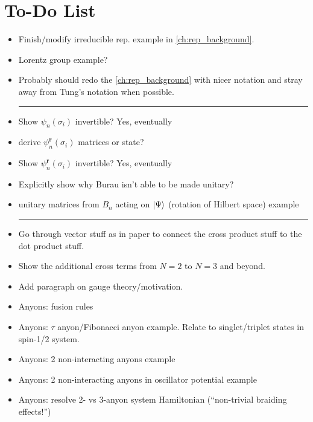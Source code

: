 \chapter{To-Do List}\label{ch:todo}

\begin{itemize}
    \item Finish/modify irreducible rep. example in \cref{ch:rep_background}.
    \item Lorentz group example?
    \item Probably should redo the \cref{ch:rep_background} with nicer notation and stray away from Tung's notation when possible.
    
    \begin{center}\rule{.85\textwidth}{0.65pt}\end{center}
    
    \item Show $\psi_n(\sigma_i)$ invertible? Yes, eventually
    \item derive $\psi_n^\textbf{r}(\sigma_i)$ matrices or state?
    \item Show $\psi_n^\textbf{r}(\sigma_i)$ invertible? Yes, eventually
    \item Explicitly show why Burau isn't able to be made unitary?~\cite{Delaney2016}
    \item unitary matrices from $B_n$ acting on $\ket{\Psi}$ (rotation of Hilbert space) example
    
    \begin{center}\rule{.85\textwidth}{0.65pt}\end{center}
    
    \item Go through vector stuff as in paper to connect the cross product stuff to the dot product stuff.
    \item Show the additional cross terms from $N=2$ to $N=3$ and beyond.
    \item Add paragraph on gauge theory/motivation.
    
    \item Anyons: fusion rules
    \item Anyons: $\tau$ anyon/Fibonacci anyon example. Relate to singlet/triplet states in spin-1/2 system.
    \item Anyons: 2 non-interacting anyons example
    \item Anyons: 2 non-interacting anyons in oscillator potential example
    \item Anyons: resolve 2- vs 3-anyon system Hamiltonian (``non-trivial braiding effects!'')
\end{itemize}
